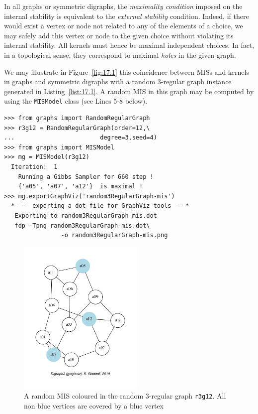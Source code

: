 In all graphs or symmetric digraphs, the \emph{maximality condition} imposed on the internal stability is equivalent to the \emph{external stability} condition. Indeed, if there would exist a vertex or node not related to any of the elements of a choice, we may safely add this vertex or node to the given choice without violating its internal stability. All kernels must hence be maximal independent choices. In fact, in a topological sense, they correspond to maximal \emph{holes} in the given graph.

We may illustrate in Figure~\vref{fig:17.1} this coincidence between MISs and kernels in graphs and symmetric digraphs with a random 3-regular graph instance generated in Listing~\vref{list:17.1}. A random MIS in this graph may be computed by using the \texttt{MISModel} class (see Lines 5-8 below).
\begin{lstlisting}[caption={Generating a random 3-regular graph of order 12},label=list:17.1]
>>> from graphs import RandomRegularGraph
>>> r3g12 = RandomRegularGraph(order=12,\
...                        degree=3,seed=4)
>>> from graphs import MISModel
>>> mg = MISModel(r3g12)
  Iteration:  1
    Running a Gibbs Sampler for 660 step !
    {'a05', 'a07', 'a12'}  is maximal !
>>> mg.exportGraphViz('random3RegularGraph-mis')
  *---- exporting a dot file for GraphViz tools ---*
   Exporting to random3RegularGraph-mis.dot
   fdp -Tpng random3RegularGraph-mis.dot\
                -o random3RegularGraph-mis.png
\end{lstlisting}
\begin{figure}[ht]
\sidecaption[t]
\includegraphics[width=6cm]{Figures/17-1-random3RegularGraph-mis.pdf}
\caption{A random MIS coloured in the random 3-regular graph \texttt{r3g12}. All non blue vertices are covered by a blue vertex}
\label{fig:17.1}       %
\end{figure}

